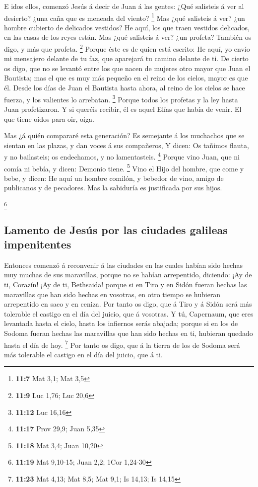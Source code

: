  E idos ellos, comenzó Jesús á decir de Juan á las gentes:
¿Qué salisteis á ver al desierto? ¿una caña que es meneada del viento?
\footnote{\textbf{11:7} Mat 3,1; Mat 3,5}  Mas ¿qué
salisteis á ver? ¿un hombre cubierto de delicados vestidos? He aquí, los
que traen vestidos delicados, en las casas de los reyes están.
 Mas ¿qué salisteis á ver? ¿un profeta? También os digo, y
más que profeta. \footnote{\textbf{11:9} Luc 1,76; Luc 20,6}
 Porque éste es de quien está escrito: He aquí, yo envío mi
mensajero delante de tu faz, que aparejará tu camino delante de ti.
 De cierto os digo, que no se levantó entre los que nacen
de mujeres otro mayor que Juan el Bautista; mas el que es muy más
pequeño en el reino de los cielos, mayor es que él.  Desde
los días de Juan el Bautista hasta ahora, al reino de los cielos se hace
fuerza, y los valientes lo arrebatan. \footnote{\textbf{11:12} Luc 16,16}
 Porque todos los profetas y la ley hasta Juan
profetizaron.  Y si queréis recibir, él es aquel Elías que
había de venir.  El que tiene oídos para oir, oiga.

 Mas ¿á quién compararé esta generación? Es semejante á los
muchachos que se sientan en las plazas, y dan voces á sus compañeros,
 Y dicen: Os tañimos flauta, y no bailasteis; os
endechamos, y no lamentasteis. \footnote{\textbf{11:17} Prov 29,9; Juan
  5,35}  Porque vino Juan, que ni comía ni bebía, y dicen:
Demonio tiene. \footnote{\textbf{11:18} Mat 3,4; Juan 10,20}
 Vino el Hijo del hombre, que come y bebe, y dicen: He aquí
un hombre comilón, y bebedor de vino, amigo de publicanos y de
pecadores. Mas la sabiduría es justificada por sus hijos.

\footnote{\textbf{11:19} Mat 9,10-15; Juan 2,2; 1Cor 1,24-30}

\hypertarget{lamento-de-jesuxfas-por-las-ciudades-galileas-impenitentes}{%
\subsection{Lamento de Jesús por las ciudades galileas
impenitentes}\label{lamento-de-jesuxfas-por-las-ciudades-galileas-impenitentes}}

 Entonces comenzó á reconvenir á las ciudades en las cuales
habían sido hechas muy muchas de sus maravillas, porque no se habían
arrepentido, diciendo:  ¡Ay de ti, Corazín! ¡Ay de ti,
Bethsaida! porque si en Tiro y en Sidón fueran hechas las maravillas que
han sido hechas en vosotras, en otro tiempo se hubieran arrepentido en
saco y en ceniza.  Por tanto os digo, que á Tiro y á Sidón
será más tolerable el castigo en el día del juicio, que á vosotras.
 Y tú, Capernaum, que eres levantada hasta el cielo, hasta
los infiernos serás abajada; porque si en los de Sodoma fueran hechas
las maravillas que han sido hechas en ti, hubieran quedado hasta el día
de hoy. \footnote{\textbf{11:23} Mat 4,13; Mat 8,5; Mat 9,1; Is 14,13;
  Is 14,15}  Por tanto os digo, que á la tierra de los de
Sodoma será más tolerable el castigo en el día del juicio, que á ti.

